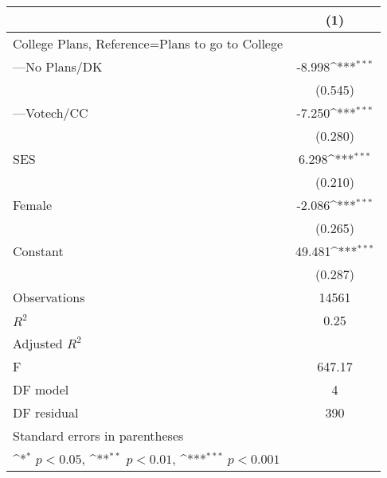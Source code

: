 {
\def\sym#1{\ifmmode^{#1}\else\(^{#1}\)\fi}
\begin{tabular}{l*{1}{c}}
\hline\hline
                                                  &\multicolumn{1}{c}{(1)}         \\
\hline
College Plans, Reference=Plans to go to College   &                     \\
[1em]
---No Plans/DK                                    &      -8.998\sym{***}\\
                                                  &     (0.545)         \\
[1em]
---Votech/CC                                      &      -7.250\sym{***}\\
                                                  &     (0.280)         \\
[1em]
SES                                               &       6.298\sym{***}\\
                                                  &     (0.210)         \\
[1em]
Female                                            &      -2.086\sym{***}\\
                                                  &     (0.265)         \\
[1em]
Constant                                          &      49.481\sym{***}\\
                                                  &     (0.287)         \\
\hline
Observations                                      &       14561         \\
\(R^{2}\)                                         &        0.25         \\
Adjusted \(R^{2}\)                                &                     \\
F                                                 &      647.17         \\
DF model                                          &           4         \\
DF residual                                       &         390         \\
\hline\hline
\multicolumn{2}{l}{\footnotesize Standard errors in parentheses}\\
\multicolumn{2}{l}{\footnotesize \sym{*} \(p<0.05\), \sym{**} \(p<0.01\), \sym{***} \(p<0.001\)}\\
\end{tabular}
}
